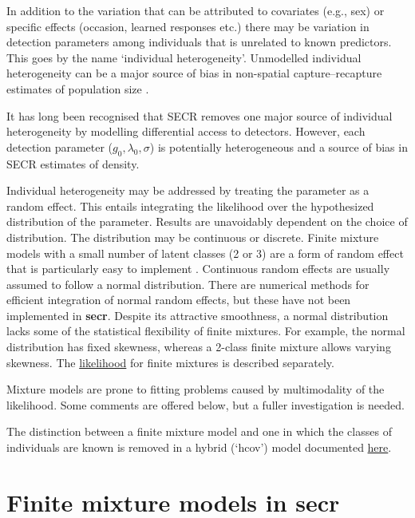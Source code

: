 \documentclass[
]{book}
\begin{document}

In addition to the variation that can be attributed to covariates (e.g., sex) or specific effects (occasion, learned responses etc.) there may be variation in detection parameters among individuals that is unrelated to known predictors. This goes by the name `individual heterogeneity'. Unmodelled individual heterogeneity can be a major source of bias in non-spatial capture--recapture estimates of population size \citep{obwa78}.

It has long been recognised that SECR removes one major source of individual heterogeneity by modelling differential access to detectors. However, each detection parameter (\(g_0, \lambda_0, \sigma\)) is potentially heterogeneous and a source of bias in SECR estimates of density.

Individual heterogeneity may be addressed by treating the parameter as a random effect. This entails integrating the likelihood over the hypothesized distribution of the parameter. Results are unavoidably dependent on the choice of distribution. The distribution may be continuous or discrete. Finite mixture models with a small number of latent classes (2 or 3) are a form of random effect that is particularly easy to implement \citep{p2000}. Continuous random effects are usually assumed to follow a normal distribution. There are numerical methods for efficient integration of normal random effects, but these have not been implemented in \textbf{secr}. Despite its attractive smoothness, a normal distribution lacks some of the statistical flexibility of finite mixtures. For example, the normal distribution has fixed skewness, whereas a 2-class finite mixture allows varying skewness. The \hyperref[finite-mixtures]{likelihood} for finite mixtures is described separately.

Mixture models are prone to fitting problems caused by multimodality of the likelihood. Some comments are offered below, but a fuller investigation is needed.

The distinction between a finite mixture model and one in which the classes of individuals are known is removed in a hybrid (`hcov') model documented \hyperref[hybrid-mixtures]{here}.

\section{\texorpdfstring{Finite mixture models in \textbf{secr}}{Finite mixture models in secr}}\label{finite-mixture-models-in-secr}
\end{document}
